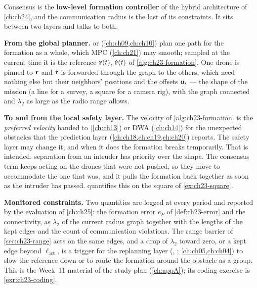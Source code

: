 \begin{dronebox}
Consensus is the \textbf{low-level formation controller} of the hybrid
architecture of \cref{ch:ch24}, and the communication radius is the last of
its constraints. It sits between two layers and talks to both.

\textbf{From the global planner.} \cbs or \ecbs (\cref{ch:ch09,ch:ch10}) plan
one path for the formation as a whole, which MPC (\cref{ch:ch21}) may smooth;
sampled at the current time it is the reference $\mathbf{r}(t)$,
$\dot{\mathbf{r}}(t)$ of \cref{alg:ch23-formation}. One drone is pinned to
$\mathbf{r}$ and $\dot{\mathbf{r}}$ is forwarded through the graph to the others,
which need nothing else but their neighbors' positions and the offsets
$\mathbf{o}_i$ --- the shape of the mission (a line for a survey, a square for a
camera rig), with the graph connected and $\lambda_2$ as large as the radio
range allows.

\textbf{To and from the local safety layer.} The velocity of
\cref{alg:ch23-formation} is the \emph{preferred velocity} handed to \orca
(\cref{ch:ch13}) or DWA (\cref{ch:ch14}) for the unexpected obstacles that
the prediction layer (\cref{ch:ch18,ch:ch19,ch:ch20}) reports. The safety
layer may change it, and when it does the formation breaks temporarily.
That is intended: separation from an intruder has priority over the shape.
The consensus term keeps acting on the drones that were not pushed, so they
move to accommodate the one that was, and it pulls the formation back
together as soon as the intruder has passed. 
quantifies this on the square of \cref{ex:ch23-square}.

\textbf{Monitored constraints.} Two quantities are logged at every period and
reported by the evaluation of \cref{ch:ch25}: the formation error $e_F$ of
\cref{def:ch23-error} and the connectivity, as $\lambda_2$ of the current radius
graph together with the lengths of the kept edges and the count of
communication violations. The range barrier of \cref{sec:ch23-range} acts on
the same edges, and a drop of $\lambda_2$ toward zero, or a kept edge beyond
$\ell_{\mathrm{act}}$, is a trigger for the replanning layer (\dstarlite,
\astar; \cref{ch:ch05,ch:ch04}) to slow the reference down or to route the
formation around the obstacle as a group. This is the Week~11 material of the
study plan (\cref{ch:appA}); its coding exercise is \cref{exr:ch23-coding}.
\end{dronebox}

